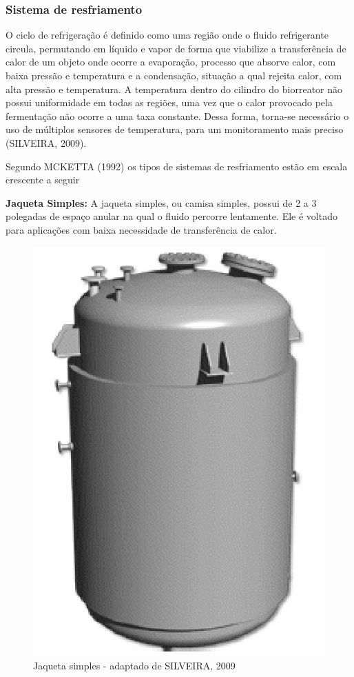 \subsubsection{Sistema de resfriamento}

O ciclo de refrigeração é definido como uma região onde o fluido refrigerante circula, permutando em líquido e vapor de forma que viabilize a transferência de calor de um objeto onde ocorre a evaporação, processo que absorve calor, com baixa pressão e temperatura e a condensação, situação a qual rejeita calor, com alta pressão e temperatura. A temperatura dentro do cilindro do biorreator não possui uniformidade em todas as regiões, uma vez que o calor provocado pela fermentação não ocorre a uma taxa constante. Dessa forma, torna-se necessário o uso de múltiplos sensores de temperatura, para um monitoramento mais preciso (SILVEIRA, 2009).

Segundo MCKETTA (1992) os tipos de sistemas de resfriamento estão em escala crescente a seguir

\textbf{Jaqueta Simples:} A jaqueta simples, ou camisa simples, possui de 2 a 3 polegadas de espaço anular na qual o fluido percorre lentamente. Ele é voltado para aplicações com baixa necessidade de transferência de calor.

\begin{figure}[h]
	\centering
	\includegraphics[keepaspectratio=true,scale=0.4]{figuras/jaqueta.eps}
	\caption{Jaqueta simples - adaptado de SILVEIRA, 2009}
	\label{jaqueta}
\end{figure}

